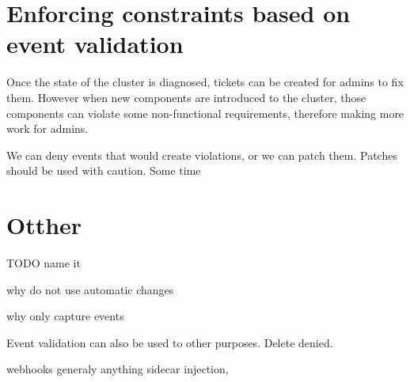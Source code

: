 \section[Event validation based]{Enforcing constraints based on event validation}

Once the state of the cluster is diagnosed, tickets can be created for admins to fix them. However when new components are introduced to the cluster, those components can violate some non-functional requirements, therefore making more work for admins.


We can deny events that would create violations, or we can patch them. Patches should be used with caution. Some time 



\section{Otther}

TODO name it

why do not use automatic changes

why only capture events



Event validation can also be used to other purposes. Delete denied.

webhooks generaly anything sidecar injection, 



